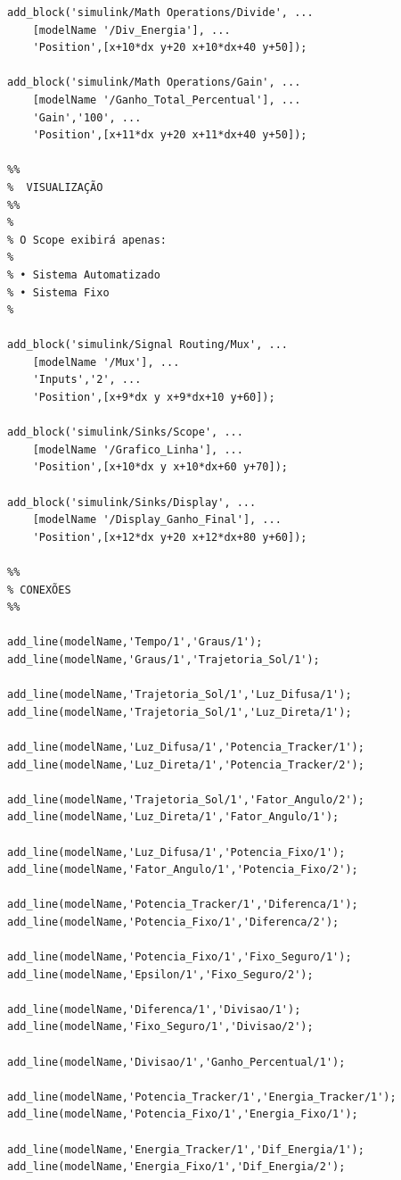\begin{apendicesenv}
\begin{verbatim}
add_block('simulink/Math Operations/Divide', ...
    [modelName '/Div_Energia'], ...
    'Position',[x+10*dx y+20 x+10*dx+40 y+50]);

add_block('simulink/Math Operations/Gain', ...
    [modelName '/Ganho_Total_Percentual'], ...
    'Gain','100', ...
    'Position',[x+11*dx y+20 x+11*dx+40 y+50]);

%% 
%  VISUALIZAÇÃO
%% 
%
% O Scope exibirá apenas:
%
% • Sistema Automatizado
% • Sistema Fixo
%

add_block('simulink/Signal Routing/Mux', ...
    [modelName '/Mux'], ...
    'Inputs','2', ...
    'Position',[x+9*dx y x+9*dx+10 y+60]);

add_block('simulink/Sinks/Scope', ...
    [modelName '/Grafico_Linha'], ...
    'Position',[x+10*dx y x+10*dx+60 y+70]);

add_block('simulink/Sinks/Display', ...
    [modelName '/Display_Ganho_Final'], ...
    'Position',[x+12*dx y+20 x+12*dx+80 y+60]);

%% 
% CONEXÕES
%% 

add_line(modelName,'Tempo/1','Graus/1');
add_line(modelName,'Graus/1','Trajetoria_Sol/1');

add_line(modelName,'Trajetoria_Sol/1','Luz_Difusa/1');
add_line(modelName,'Trajetoria_Sol/1','Luz_Direta/1');

add_line(modelName,'Luz_Difusa/1','Potencia_Tracker/1');
add_line(modelName,'Luz_Direta/1','Potencia_Tracker/2');

add_line(modelName,'Trajetoria_Sol/1','Fator_Angulo/2');
add_line(modelName,'Luz_Direta/1','Fator_Angulo/1');

add_line(modelName,'Luz_Difusa/1','Potencia_Fixo/1');
add_line(modelName,'Fator_Angulo/1','Potencia_Fixo/2');

add_line(modelName,'Potencia_Tracker/1','Diferenca/1');
add_line(modelName,'Potencia_Fixo/1','Diferenca/2');

add_line(modelName,'Potencia_Fixo/1','Fixo_Seguro/1');
add_line(modelName,'Epsilon/1','Fixo_Seguro/2');

add_line(modelName,'Diferenca/1','Divisao/1');
add_line(modelName,'Fixo_Seguro/1','Divisao/2');

add_line(modelName,'Divisao/1','Ganho_Percentual/1');

add_line(modelName,'Potencia_Tracker/1','Energia_Tracker/1');
add_line(modelName,'Potencia_Fixo/1','Energia_Fixo/1');

add_line(modelName,'Energia_Tracker/1','Dif_Energia/1');
add_line(modelName,'Energia_Fixo/1','Dif_Energia/2');


\end{verbatim}
\end{apendicesenv}
